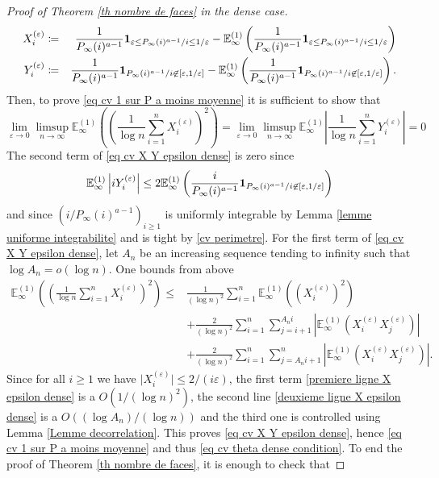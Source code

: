 \documentclass[11pt]{article}
\numberwithin{equation}{section}
\def\vp{\varepsilon}
\def\E{\mathbb{E}}
\begin{document}
\begin{proof}[Proof of Theorem \ref{th nombre de faces} in the dense case]
\begin{eqnarray*}
	X_i^{(\vp)} &\coloneqq &
	\frac{1}{P_\infty(i)^{a-1}}{\bf 1}_{\vp \le P_\infty(i)^{a-1}/i \le 1/\vp}- \E^{(1)}_\infty \left( \frac{1}{P_\infty(i)^{a-1}}{\bf 1}_{\vp \le P_\infty(i)^{a-1}/i \le 1/\vp} \right)
	\\
	Y_i^{(\vp)} &\coloneqq &
	\frac{1}{P_\infty(i)^{a-1}}{\bf 1}_{P_\infty(i)^{a-1}/i \not\in [\vp, 1/\vp]}- \E^{(1)}_\infty \left(\frac{1}{P_\infty(i)^{a-1}}{\bf 1}_{P_\infty(i)^{a-1}/i \not\in [\vp, 1/\vp]}\right).
\end{eqnarray*}
Then, to prove \eqref{eq cv 1 sur P a moins moyenne} it is sufficient to show that
\begin{equation}\label{eq cv X Y epsilon dense}
	\lim_{\vp \to 0}\limsup_{n\to \infty}\E^{(1)}_\infty\left(
	\left(
	\frac{1}{\log n}\sum_{i=1}^n X^{(\vp)}_i
	\right)^2
	\right)
	=\lim_{\vp \to 0} \limsup_{n\to \infty}
	\E^{(1)}_\infty
	\left\vert
	\frac{1}{\log n}\sum_{i=1}^n Y^{(\vp)}_i
	\right\vert
	=0
\end{equation}
The second term of \eqref{eq cv X Y epsilon dense} is zero since
$$
	\E^{(1)}_\infty \left\vert i Y^{(\vp)}_i \right\vert 
	\le  2 \E^{(1)}_\infty \left(
	\frac{i}{P_\infty(i)^{a-1}} {\bf 1}_{P_\infty(i)^{a-1}/i \not\in [\vp, 1/\vp]}
	 \right)
$$
and since $(i/P_\infty(i)^{a-1})_{i\ge 1}$ is uniformly integrable by Lemma \ref{lemme uniforme integrabilite} and is tight by \eqref{cv perimetre}. 
For the first term of \eqref{eq cv X Y epsilon dense}, let $A_n$ be an increasing sequence tending to infinity such that $\log A_n = o(\log n)$. One bounds from above
\begin{align}
	\E^{(1)}_\infty\left(
	\left(
	\frac{1}{\log n}\sum_{i=1}^n X^{(\vp)}_i
	\right)^2
	\right)
	\le
	&\frac{1}{(\log n )^2} \sum_{i=1}^n  \E^{(1)}_\infty\left(\left(X^{(\vp)}_i\right)^2\right) \label{premiere ligne X epsilon dense}\\
	&+ \frac{2}{(\log n)^2} \sum_{i=1}^n \sum_{j=i+1}^{A_ni} 
	\left\vert \E^{(1)}_\infty \left(X^{(\vp)}_i X^{(\vp)}_j \right) \right\vert \label{deuxieme ligne X epsilon dense} \\
	&+\frac{2}{(\log n)^2} \sum_{i=1}^n \sum_{j=A_n i+1}^{n} 
	\left\vert \E^{(1)}_\infty \left(X^{(\vp)}_i X^{(\vp)}_j \right) \right\vert. \label{troisieme ligne X epsilon dense}
\end{align}
Since for all $i\ge 1$ we have $\vert X_i^{(\vp)} \vert\le 2/(i\vp)$, the first term \eqref{premiere ligne X epsilon dense} is a $O(1/(\log n)^2)$, the second line \eqref{deuxieme ligne X epsilon dense} is a $O((\log A_n)/(\log n))$ and the third one is controlled using Lemma \ref{Lemme decorrelation}. This proves \eqref{eq cv X Y epsilon dense}, hence \eqref{eq cv 1 sur P a moins moyenne} and thus \eqref{eq cv theta dense condition}. To end the proof of Theorem \ref{th nombre de faces}, it is enough to check that

\end{proof}
\end{document}
